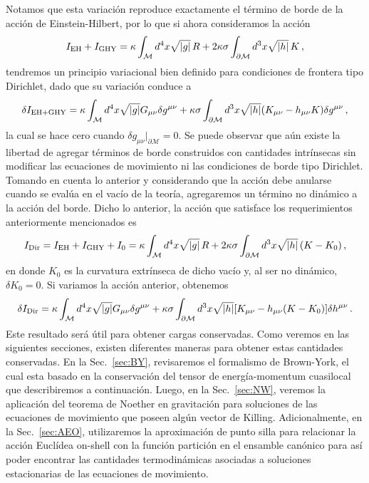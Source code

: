 \documentclass[../Main.tex]{subfiles}
\begin{document}
Notamos que esta variación reproduce exactamente el término de borde de la acción de Einstein-Hilbert, por lo que si ahora consideramos la acción 
\begin{align}\label{ehghy}
    I_{\rm EH}+I_{\rm GHY}=\kappa \int_{\mathcal{M}} d^{4}x \sqrt{\lvert g\rvert}\, R +  2\kappa\sigma\int_{\partial\mathcal{M}} d^{3}x \sqrt{\lvert h\rvert}\, K \, , 
\end{align}
tendremos un principio variacional bien definido para condiciones de frontera tipo Dirichlet, dado que su variación conduce a 
\begin{align}
    \delta I_{\rm EH+GHY}=\kappa\int_{\mathcal{M}}d^{4}x \sqrt{\lvert g\rvert}G_{\mu\nu}\delta g^{\mu\nu}+ \kappa\sigma\int_{\partial\mathcal{M}} d^{3}x\sqrt{\lvert h\rvert}(K_{\mu\nu}-h_{\mu\nu}K)\delta g^{\mu\nu}\, , \label{var4}
\end{align}
la cual se hace cero cuando $\delta g_{\mu\nu}|_{\partial{\mathcal{M}}}=0$. Se puede observar que aún existe la libertad de agregar términos de borde construidos con cantidades intrínsecas sin modificar las ecuaciones de movimiento ni las condiciones de borde tipo Dirichlet. Tomando en cuenta lo anterior y considerando que la acción debe anularse cuando se evalúa en el vacío de la teoría, agregaremos un término no dinámico a la acción del borde. Dicho lo anterior, la acción que satisface los requerimientos anteriormente mencionados es
\begin{align}
 I_{\rm Dir}=I_{\rm EH}+I_{\rm GHY}+I_{0}=\kappa \int_{\mathcal{M}} d^{4}x \sqrt{\lvert g\rvert}\, R + 2 \kappa\sigma\int_{\partial\mathcal{M}} d^{3}x \sqrt{\lvert h\rvert}\, (K-K_{0})\, , \label{acciondir}
\end{align}
en donde $K_{0}$ es la curvatura extrínseca de dicho vacío y, al ser no dinámico, $\delta K_{0}=0$. Si variamos la acción anterior, obtenemos 
\begin{align}
\delta I_{\rm Dir}=\kappa\int_{\mathcal{M}}d^{4}x \sqrt{\lvert g\rvert}G_{\mu\nu}\delta g^{\mu\nu}+\kappa\sigma\int_{\partial\mathcal{M}} d^{3}x\sqrt{\lvert h\rvert}[K_{\mu\nu}-h_{\mu\nu}(K-K_{0})]\delta h^{\mu\nu}\, .  
\end{align}
Este resultado será útil para obtener cargas conservadas. Como veremos en las siguientes secciones, existen diferentes maneras para obtener estas cantidades conservadas. En la Sec.~\ref{sec:BY}, revisaremos el formalismo de Brown-York, el cual esta basado en la conservación del tensor de energía-momentum cuasilocal que describiremos a continuación. Luego, en la Sec.~\ref{sec:NW}, veremos la aplicación del teorema de Noether en gravitación para soluciones de las ecuaciones de movimiento que poseen algún vector de Killing. Adicionalmente, en la Sec.~\ref{sec:AEO}, utilizaremos la aproximación de punto silla para relacionar la acción Euclídea on-shell con la función partición en el ensamble canónico para así poder encontrar las cantidades termodinámicas asociadas a soluciones estacionarias de las ecuaciones de movimiento.
\end{document}
